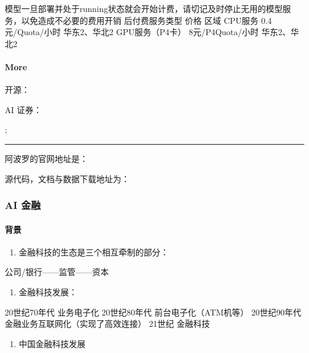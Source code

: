\documentclass[letterpaper,11pt,english]{sphinxmanual}
\begin{document}
模型一旦部署并处于running状态就会开始计费，请切记及时停止无用的模型服务，以免造成不必要的费用开销
后付费服务类型 价格 区域 CPU服务 0.4元/Quota/小时 华东2、华北2
GPU服务（P4卡） 8元/P4Quota/小时 华东2、华北2


\paragraph{More}
\label{\detokenize{chapter_project/AI_company:more}}
 
开源： 

AI 证券：

;


\bigskip\hrule\bigskip


阿波罗的官网地址是： 

源代码，文档与数据下载地址为： 


\subsubsection{AI 金融}
\label{\detokenize{chapter_project/AI_Finance:ai}}\label{\detokenize{chapter_project/AI_Finance::doc}}

\paragraph{背景}
\label{\detokenize{chapter_project/AI_Finance:id1}}\begin{enumerate}
%
\item {} 
金融科技的生态是三个相互牵制的部分：

\end{enumerate}

公司/银行——监管——资本
\begin{enumerate}
%
\setcounter{enumi}{1}
\item {} 
金融科技发展：

\end{enumerate}

20世纪70年代 业务电子化 20世纪80年代 前台电子化（ATM机等） 20世纪90年代
金融业务互联网化（实现了高效连接） 21世纪 金融科技
\begin{enumerate}
%
\setcounter{enumi}{2}
\item {} 
中国金融科技发展

\end{enumerate}
\end{document}
